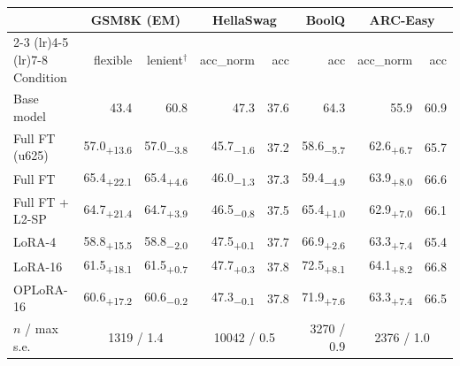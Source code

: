 \setlength{\tabcolsep}{4pt}
\begin{tabular}{@{}l rr rr r rr@{}}
\toprule
 & \multicolumn{2}{c}{GSM8K (EM)} & \multicolumn{2}{c}{HellaSwag} & BoolQ & \multicolumn{2}{c}{ARC-Easy} \\ \cmidrule(lr){2-3} \cmidrule(lr){4-5} \cmidrule(lr){7-8}
Condition & flexible & lenient$^\dagger$ & acc\_norm & acc & acc & acc\_norm & acc \\
\midrule
Base model & 43.4 & 60.8 & 47.3 & 37.6 & 64.3 & 55.9 & 60.9 \\
Full FT (u625) & 57.0\textsubscript{+13.6} & 57.0\textsubscript{$-$3.8} & 45.7\textsubscript{$-$1.6} & 37.2 & 58.6\textsubscript{$-$5.7} & 62.6\textsubscript{+6.7} & 65.7 \\
\addlinespace[1pt]
Full FT & 65.4\textsubscript{+22.1} & 65.4\textsubscript{+4.6} & 46.0\textsubscript{$-$1.3} & 37.3 & 59.4\textsubscript{$-$4.9} & 63.9\textsubscript{+8.0} & 66.6 \\
Full FT + L2-SP & 64.7\textsubscript{+21.4} & 64.7\textsubscript{+3.9} & 46.5\textsubscript{$-$0.8} & 37.5 & 65.4\textsubscript{+1.0} & 62.9\textsubscript{+7.0} & 66.1 \\
LoRA-4 & 58.8\textsubscript{+15.5} & 58.8\textsubscript{$-$2.0} & 47.5\textsubscript{+0.1} & 37.7 & 66.9\textsubscript{+2.6} & 63.3\textsubscript{+7.4} & 65.4 \\
LoRA-16 & 61.5\textsubscript{+18.1} & 61.5\textsubscript{+0.7} & 47.7\textsubscript{+0.3} & 37.8 & 72.5\textsubscript{+8.1} & 64.1\textsubscript{+8.2} & 66.8 \\
OPLoRA-16 & 60.6\textsubscript{+17.2} & 60.6\textsubscript{$-$0.2} & 47.3\textsubscript{$-$0.1} & 37.8 & 71.9\textsubscript{+7.6} & 63.3\textsubscript{+7.4} & 66.5 \\
\midrule
$n$ / max s.e. & \multicolumn{2}{c}{1319 / 1.4} & \multicolumn{2}{c}{10042 / 0.5} & 3270 / 0.9 & \multicolumn{2}{c}{2376 / 1.0} \\
\bottomrule
\end{tabular}
